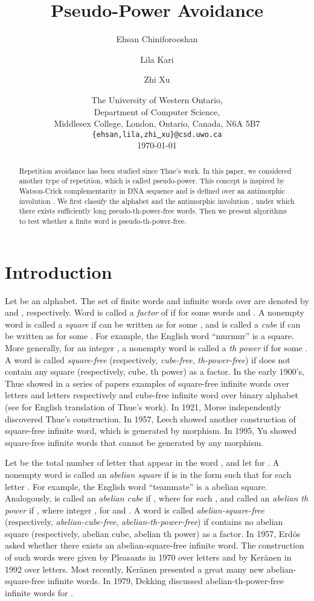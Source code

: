 \documentclass[12pt]{article}
\title{Pseudo-Power Avoidance}
\author{Ehsan Chiniforooshan \and Lila Kari \and Zhi Xu}
\date{The University of Western Ontario, \\
Department of Computer Science, \\
Middlesex College, London, Ontario, Canada, N6A 5B7 \\
{\tt \{ehsan,lila,zhi\underline{ }xu\}@csd.uwo.ca} \\
\medskip \today}
\begin{document}
\maketitle


\begin{abstract}
Repetition avoidance has been studied since Thue's work. In this
paper, we considered another type of repetition, which is called
pseudo-power. This concept is inspired by Watson-Crick
complementarity in DNA sequence and is defined over an antimorphic
involution . We first classify the alphabet  and the
antimorphic involution , under which there exists sufficiently
long pseudo-th-power-free words. Then we present algorithms to
test whether a finite word  is pseudo-th-power-free.
\end{abstract}


\section{Introduction}\label{section:introduction}
Let  be an alphabet. The set of finite words and infinite
words over  are denoted by  and ,
respectively. Word  is called a \emph{factor} of  if 
for some words  and . A nonempty word  is called a
\emph{square} if  can be written as  for some
, and is called a \emph{cube} if  can be written as
 for some . For example, the English word
``murmur'' is a square. More generally, for an integer , a
nonempty word  is called a \emph{th power} if  for some
. A word  is called \emph{square-free}
(respectively, \emph{cube-free}, \emph{th-power-free}) if 
does not contain any square (respectively, cube, th power) as a
factor. In the early 1900's, Thue showed in a series of papers
examples of square-free infinite words over  letters and 
letters respectively and cube-free infinite word over binary
alphabet \cite{Thue1906,Thue1912} (see \cite{Berstel1995} for
English translation of Thue's work). In 1921, Morse \cite{Morse1921}
independently discovered Thue's construction. In 1957, Leech
\cite{Leech1957} showed another construction of square-free infinite
word, which is generated by morphism. In 1995, Yu \cite{Yu1995}
showed square-free infinite words that cannot be generated by any
morphism.


Let  be the total number of letter  that appear in the
word , and let  for
. A nonempty word  is called an \emph{abelian
square} if  is in the form  such that
 for each letter . For example, the
English word ``teammate'' is a abelian square. Analogously,
 is called an \emph{abelian cube} if , where
 for each , and
called an \emph{abelian th power} if , where
integer ,  for  and
. A word  is called \emph{abelian-square-free}
(respectively, \emph{abelian-cube-free},
\emph{abelian-th-power-free}) if  contains no abelian square
(respectively, abelian cube, abelian th power) as a factor. In
1957, Erd\"os \cite{Erdos1957} asked whether there exists an
abelian-square-free infinite word. The construction of such words
were given by Pleasants \cite{Pleasants1970} in 1970 over 
letters and by Ker\"anen \cite{Keranen1992} in 1992 over 
letters. Most recently, Ker\"anen \cite{Keranen2009} presented a
great many new abelian-square-free infinite words. In 1979, Dekking
\cite{Dekking1979} discussed abelian-th-power-free infinite words
for .
\end{document}

